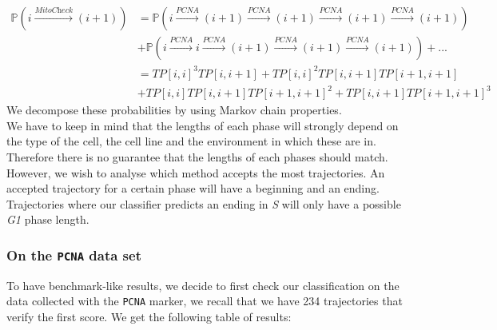 \documentclass{article}
\begin{document}
\begin{align*}
\mathbb{P}(i \overset{\textit{MitoCheck}}{\longrightarrow} (i+1)) & = \mathbb{P}(i \overset{\textit{PCNA}}{\longrightarrow} (i+1) \overset{\textit{PCNA}}{\longrightarrow} (i+1) \overset{\textit{PCNA}}{\longrightarrow} (i+1) \overset{\textit{PCNA}}{\longrightarrow} (i+1)) \\ &  + \mathbb{P}(i \overset{\textit{PCNA}}{\longrightarrow} i \overset{\textit{PCNA}}{\longrightarrow} (i+1) \overset{\textit{PCNA}}{\longrightarrow} (i+1) \overset{\textit{PCNA}}{\longrightarrow} (i+1)) + ...  \\
& = TP[i,i]^3 TP [i,i+1] + TP[i,i]^2 TP [i,i+1] TP[i+1,i+1] \\ & + TP[i,i] TP [i,i+1] TP[i+1,i+1]^2 + TP [i,i+1] TP [i+1,i+1]^3 
\end{align*}
We decompose these probabilities by using Markov chain properties. \\
We have to keep in mind that the lengths of each phase will strongly depend on the type of the cell, the cell line and the environment in which these are in. Therefore there is no guarantee that the lengths of each phases should match. However, we wish to analyse which method accepts the most trajectories. An accepted trajectory for a certain phase will have a beginning and an ending. Trajectories where our classifier predicts an ending in \textit{S} will only have a possible \textit{G1} phase length. 
\subsubsection{On the \texttt{PCNA} data set}
To have benchmark-like results, we decide to first check our classification on the data collected with the \texttt{PCNA} marker, we recall that we have 234 trajectories that verify the first score. We get the following table of results:
\end{document}
